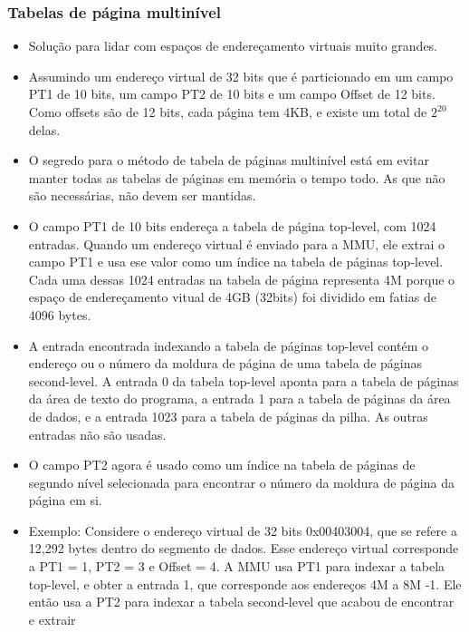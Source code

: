 \documentclass[10pt]{article}
\begin{document}
\subsubsection{Tabelas de página multinível}
\begin{itemize}
    \item Solução para lidar com espaços de endereçamento virtuais muito grandes.
    \item Assumindo um endereço virtual de 32 bits que é particionado em um campo
        PT1 de 10 bits, um campo PT2 de 10 bits e um campo Offset de 12 bits. 
        Como offsets são de 12 bits, cada página tem 4KB, e existe um total de
        \begin{math}2^{20}\end{math} delas. 
    \item O segredo para o método de tabela de páginas multinível está em evitar
        manter todas as tabelas de páginas em memória o tempo todo. As que não 
        são necessárias, não devem ser mantidas.
    \item O campo PT1 de 10 bits endereça a tabela de página top-level, com 1024 
        entradas. Quando um endereço virtual é enviado para a MMU, ele extrai o
        campo PT1 e usa ese valor como um índice na tabela de páginas top-level.
        Cada uma dessas 1024 entradas na tabela de página representa 4M porque
        o espaço de endereçamento vitual de 4GB (32bits) foi dividido em fatias
        de 4096 bytes.
    \item A entrada encontrada indexando a tabela de páginas top-level contém
        o endereço ou o número da moldura de página de uma tabela de páginas
        second-level. A entrada 0 da tabela top-level aponta para a tabela de páginas
        da área de texto do programa, a entrada 1 para a tabela de páginas da área
        de dados, e a entrada 1023 para a tabela de páginas da pilha. As outras 
        entradas não são usadas.
    \item O campo PT2 agora é usado como um índice na tabela de páginas de segundo
        nível selecionada para encontrar o número da moldura de página da página
        em si.
    \item Exemplo: Considere o endereço virtual de 32 bits 0x00403004, que se refere
        a 12,292 bytes dentro do segmento de dados. Esse endereço virtual corresponde
        a PT1 = 1, PT2 = 3 e Offset = 4. A MMU usa PT1 para indexar a tabela top-level,
        e obter a entrada 1, que corresponde aos endereços 4M a 8M -1. Ele então usa
        a PT2 para indexar a tabela second-level que acabou de encontrar e extrair

\end{itemize}
\end{document}
